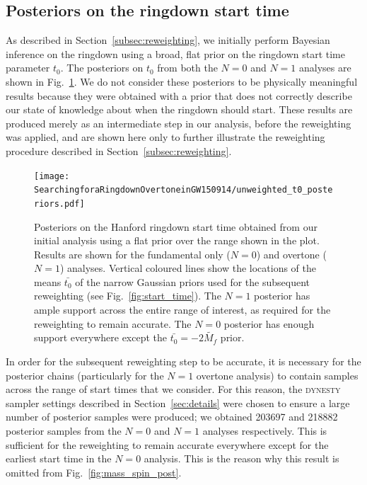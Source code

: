 \subsection{Posteriors on the ringdown start time}\label{app:t0_posterior_prior}

As described in Section~\ref{subsec:reweighting}, we initially perform Bayesian inference on the ringdown using a broad, flat prior on the ringdown start time parameter $t_0$. 
The posteriors on $t_0$ from both the $N=0$ and $N=1$ analyses are shown in Fig.~\ref{fig:t0_posterior}.
We do not consider these posteriors to be physically meaningful results because they were obtained with a prior that does not correctly describe our state of knowledge about when the ringdown should start.
These results are produced merely as an intermediate step in our analysis, before the reweighting was applied, and are shown here only to further illustrate the reweighting procedure described in Section~\ref{subsec:reweighting}.

\begin{figure}[b!]
    \centering
    \texttt{[image: SearchingforaRingdownOvertoneinGW150914/unweighted\_t0\_posteriors.pdf]}
    \caption[Posteriors on the GW150914 ringdown start time, using a flat prior]{ 
    Posteriors on the Hanford ringdown start time obtained from our initial analysis using a flat prior over the range shown in the plot.
    Results are shown for the fundamental only ($N=0$) and overtone ($N=1$) analyses.
    Vertical coloured lines show the locations of the means $\bar{t_0}$ of the narrow Gaussian priors used for the subsequent reweighting (see Fig.~\ref{fig:start_time}).
    The $N=1$ posterior has ample support across the entire range of interest, as required for the reweighting to remain accurate.
    The $N=0$ posterior has enough support everywhere except the $\bar{t_0}=-2\tilde{M_f}$ prior.
    }
    \label{fig:t0_posterior}
\end{figure}

In order for the subsequent reweighting step to be accurate, it is necessary for the posterior chains (particularly for the $N=1$ overtone analysis) to contain samples across the range of start times that we consider. 
For this reason, the \textsc{dynesty} sampler settings described in Section~\ref{sec:details} were chosen to ensure a large number of posterior samples were produced; we obtained 203697 and 218882 posterior samples from the $N=0$ and $N=1$ analyses respectively. 
This is sufficient for the reweighting to remain accurate everywhere except for the earliest start time in the $N=0$ analysis. 
This is the reason why this result is omitted from Fig.~\ref{fig:mass_spin_post}.


